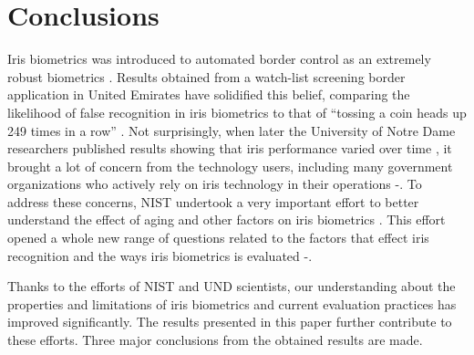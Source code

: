 \documentclass{cta-author}%
\newcommand{\cmt}[1]{}
\begin{document}
\section{Conclusions}




Iris biometrics was introduced to  automated border control as an extremely robust biometrics \cite{Daugman2002}.
Results obtained 
\cmt{by the technology inventor} from a
watch-list screening border application in United Emirates have  solidified this belief, %
comparing the likelihood of false recognition in iris biometrics to that of ``tossing a coin heads up 249 times  in a row'' \cite{Daugman2006}.
Not surprisingly, when later the University of Notre Dame researchers 
published results showing that iris performance varied over time \cmt{ among the test participants} \cite{Bowyer,Bowyer2,Bowyer3}, it brought a lot of concern from the technology users, including many government organizations 
who actively rely on iris technology in their operations \cite{aging}-\cite{aging3}. %
To address these concerns, NIST undertook a very important effort
to better understand the effect of aging and other factors on  iris biometrics \cite{irexVI}. This effort opened a whole new range of 
questions related to the factors that effect iris recognition
and  the ways  iris biometrics is  evaluated \cite{Grother2015-iet}-\cite{Bowyer-BTAS2016}.

Thanks to the efforts of NIST and UND scientists, our understanding about the properties and limitations of iris biometrics and current evaluation practices has improved significantly. The results presented in this paper further contribute to these efforts. 
Three major conclusions from the obtained results  are made.
\end{document}
